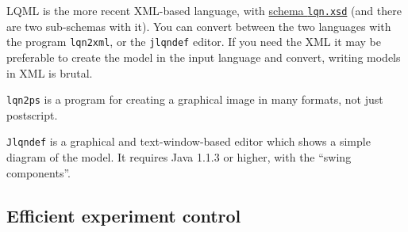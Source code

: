 \documentclass[11pt]{article}
\begin{document}
LQML is the more recent XML-based language, with \href{http://www.sce.carleton.ca/rads/lqns/lqn-schema/lqn.xsd''}{schema \texttt{lqn.xsd}} (and there are two
sub-schemas with it). You can convert between the two languages with the program \texttt{lqn2xml}, or the
\texttt{jlqndef} editor. If you need the XML it may be preferable to create the model in the input language
and convert, writing models in XML is brutal.

\texttt{lqn2ps} is a program for creating a graphical image in many formats, not just postscript.

\texttt{Jlqndef} is a graphical and text-window-based editor which shows a simple diagram of the
model. It requires Java 1.1.3 or higher, with the ``swing components''.

\subsection{Efficient experiment control}
\label{sec:spex}
\end{document}
